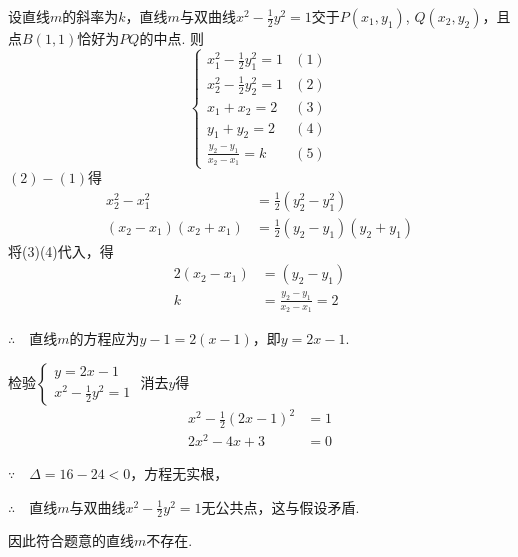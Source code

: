 \begin{solution}
设直线$m$的斜率为$k$，直线$m$与双曲线$x^2-\frac{1}{2}y^2=1$交于$P(x_1,y_1)$, $Q(x_2,y_2)$，且点$B(1,1)$恰好为$PQ$的中点. 则  
\[\begin{cases}
    x^2_1-\frac{1}{2}y_1^2=1&   (1)\\[1.5ex]
    x^2_2-\frac{1}{2}y^2_2=1&   (2)\\[1.5ex]
x_1+x_2=2&  (3)\\
y_1+y_2=2&  (4)\\[1.5ex]
\frac{y_2-y_1}{x_2-x_1}=k&  (5)
\end{cases}\]
$(2)-(1)$得
\[\begin{split}
   x^2_2-x^2_1&=\frac{1}{2}(y^2_2-y^2_1)\\
   (x_2-x_1)(x_2+x_1)&=\frac{1}{2}(y_2-y_1)(y_2+y_1)
\end{split}\]
将(3)(4)代入，得
\[\begin{split}
    2(x_2-x_1) &=(y_2-y_1)\\
    k&=\frac{y_2-y_1}{x_2-x_1}=2
\end{split}\]

$\therefore\quad$直线$m$的方程应为$y-1=2(x-1)$，即$y=2x-1$.

检验$\begin{cases}
    y=2x-1\\[1.5ex] x^2-\frac{1}{2}y^2=1
\end{cases}$
消去$y$得
\[\begin{split}
x^2-\frac{1}{2}(2x-1)^2&=1\\
2x^2-4x+3&=0    
\end{split}\]

$\because\quad \Delta=16-24<0$，方程无实根，

$\therefore\quad $直线$m$与双曲线$x^2-\frac{1}{2}y^2=1$无公共点，这与假设矛盾.

因此符合题意的直线$m$不存在.
\end{solution}

